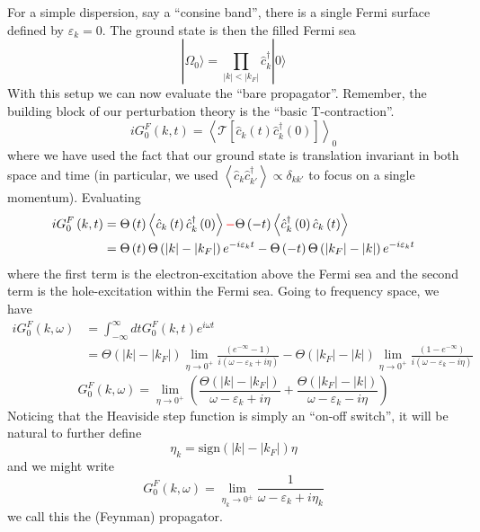 For a simple dispersion, say a ``consine band'', there is a single Fermi surface defined by $\varepsilon_k=0$. The ground state is then the filled Fermi sea
\[ |\Omega _0\rangle =\prod_{\left| k \right|<\left| k_F \right|}{\hat{c}_{k}^{\dagger}}|0\rangle \]
With this setup we can now evaluate the ``bare propagator''. Remember, the building block of our perturbation theory is the ``basic T-contraction''.
\[ iG_{0}^{F}\left( k,t \right) =\left< \mathcal{T} \left[ \hat{c}_k\left( t \right) \hat{c}_{k}^{\dagger}\left( 0 \right) \right] \right> _0\]
where we have used the fact that our ground state is translation invariant in both space and time (in particular, we used $\left< \hat{c}_k\hat{c}_{k'}^{\dagger} \right> \propto \delta _{kk'}$ to focus on a single momentum). Evaluating
\begin{align*}
    iG_{0}^{F}\left( k,t \right) &=\Theta \left( t \right) \left< \hat{c}_k\left( t \right) \hat{c}_{k}^{\dagger}\left( 0 \right) \right> {\color{red} -}\Theta \left( -t \right) \left< \hat{c}_{k}^{\dagger}\left( 0 \right) \hat{c}_k\left( t \right) \right> \\
    &=\Theta \left( t \right) \Theta \left( \left| k \right|-\left| k_F \right| \right) e^{-i\varepsilon _kt}-\Theta \left( -t \right) \Theta \left( \left| k_F \right|-\left| k \right| \right) e^{-i\varepsilon _kt}
\end{align*}
where the first term is the electron-excitation above the Fermi sea and the second term is the hole-excitation within the Fermi sea. Going to frequency space, we have
\begin{align*}
    iG_{0}^{F}\left( k,\omega \right) &=\int_{-\infty}^{\infty}{dtG_{0}^{F}\left( k,t \right) e^{i\omega t}}\\
    &=\Theta \left( \left| k \right|-\left| k_F \right| \right) \lim_{\eta \rightarrow 0^+} \frac{\left( e^{-\infty}-1 \right)}{i\left( \omega -\varepsilon _k+i\eta \right)}-\Theta \left( \left| k_F \right|-\left| k \right| \right) \lim_{\eta \rightarrow 0^+} \frac{\left( 1-e^{-\infty} \right)}{i\left( \omega -\varepsilon _k-i\eta \right)}
\end{align*}
\[ G_{0}^{F}\left( k,\omega \right) =\lim_{\eta \rightarrow 0^+} \left( \frac{\Theta \left( \left| k \right|-\left| k_F \right| \right)}{\omega -\varepsilon _k+i\eta}+\frac{\Theta \left( \left| k_F \right|-\left| k \right| \right)}{\omega -\varepsilon _k-i\eta} \right) \]
Noticing that the Heaviside step function is simply an ``on-off switch'', it will be natural to further define
\[ \eta _k=\mathrm{sign}\left( \left| k \right|-\left| k_F \right| \right) \eta \]
and we might write
\[ G_{0}^{F}\left( k,\omega \right) =\lim_{\eta _k\rightarrow 0^{\pm}} \frac{1}{\omega -\varepsilon _k+i\eta _k}\]
we call this the (Feynman) propagator.

